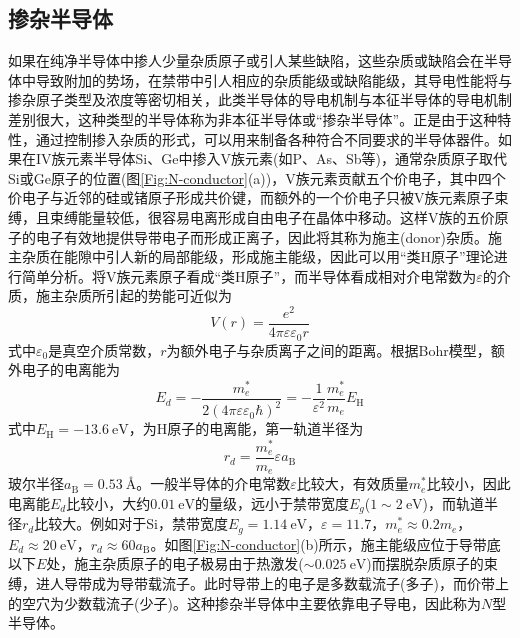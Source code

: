 \subsection{掺杂半导体} 
如果在纯净半导体中掺人少量杂质原子或引人某些缺陷，这些杂质或缺陷会在半导体中导致附加的势场，在禁带中引人相应的杂质能级或缺陷能级，其导电性能将与掺杂原子类型及浓度等密切相关，此类半导体的导电机制与本征半导体的导电机制差别很大，这种类型的半导体称为非本征半导体或``掺杂半导体''。正是由于这种特性，通过控制掺入杂质的形式，可以用来制备各种符合不同要求的半导体器件。如果在IV族元素半导体Si、Ge中掺入V族元素(如P、As、Sb等)，通常杂质原子取代Si或Ge原子的位置(图\ref{Fig:N-conductor}(a))，V族元素贡献五个价电子，其中四个价电子与近邻的硅或锗原子形成共价键，而额外的一个价电子只被V族元素原子束缚，且束缚能量较低，很容易电离形成自由电子在晶体中移动。这样V族的五价原子的电子有效地提供导带电子而形成正离子，因此将其称为施主(donor)杂质。施主杂质在能隙中引人新的局部能级，形成施主能级，因此可以用``类H原子''理论进行简单分析。将V族元素原子看成``类H原子''，而半导体看成相对介电常数为$\varepsilon$的介质，施主杂质所引起的势能可近似为
\begin{equation}
	V(r)=\dfrac{e^2}{4\pi\varepsilon\varepsilon_0r}
	\label{eq:donor-V}
\end{equation}
式中$\varepsilon_0$是真空介质常数，$r$为额外电子与杂质离子之间的距离。根据Bohr模型，额外电子的电离能为
\begin{equation}
	E_d=-\dfrac{m_e^{\ast}}{2(4\pi\varepsilon\varepsilon_0\hbar)^2}=-\dfrac1{\varepsilon^2}\dfrac{m_e^{\ast}}{m_e}E_{\mathrm{H}}
	\label{eq:donor-deion}
\end{equation}
式中$E_{\mathrm{H}}=-13.6~\mathrm{eV}$，为H原子的电离能，第一轨道半径为
\begin{equation}
	r_d=\dfrac{m_e^{\ast}}{m_e}\varepsilon a_{\mathrm{B}}
	\label{eq:donor-1-radius}
\end{equation}
玻尔半径$a_{\mathrm{B}}=0.53~\mbox{\AA}$。一般半导体的介电常数$\varepsilon$比较大，有效质量$m_e^{\ast}$比较小，因此电离能$E_d$比较小，大约$0.01~\mathrm{eV}$的量级，远小于禁带宽度$E_g$($1\sim2~\mathrm{eV}$)，而轨道半径$r_d$比较大。例如对于Si，禁带宽度$E_g=1.14~\mathrm{eV}$，$\varepsilon=11.7$，$m_e^{\ast}\approx0.2m_e$，$E_d\approx20~\mathrm{eV}$，$r_d\approx60a_{\mathrm{B}}$。如图\ref{Fig:N-conductor}(b)所示，施主能级应位于导带底以下$E$处，施主杂质原子的电子极易由于热激发($\sim0.025~\mathrm{eV}$)而摆脱杂质原子的束缚，进人导带成为导带载流子。此时导带上的电子是多数载流子(多子)，而价带上的空穴为少数载流子(少子)。这种掺杂半导体中主要依靠电子导电，因此称为$N$型半导体。
